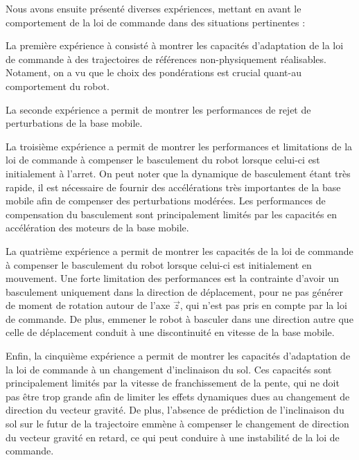       Nous avons ensuite présenté diverses expériences, mettant en avant le comportement de la loi de commande dans des situations pertinentes :
      
      La première expérience à consisté à montrer les capacités d'adaptation de la loi de commande à des trajectoires de références non-physiquement réalisables.
      Notament, on a vu que le choix des pondérations est crucial quant-au comportement du robot.
      
      La seconde expérience a permit de montrer les performances de rejet de perturbations de la base mobile.
      
      La troisième expérience a permit de montrer les performances et limitations de la loi de commande à compenser le basculement du robot lorsque celui-ci est initialement à l'arret.
      On peut noter que la dynamique de basculement étant très rapide, il est nécessaire de fournir des accélérations très importantes de la base mobile afin de compenser des perturbations modérées.
      Les performances de compensation du basculement sont principalement limités par les capacités en accélération des moteurs de la base mobile.
      
      La quatrième expérience a permit de montrer les capacités de la loi de commande à compenser le basculement du robot lorsque celui-ci est initialement en mouvement.
      Une forte limitation des performances est la contrainte d'avoir un basculement uniquement dans la direction de déplacement, pour ne pas générer de moment de rotation autour de l'axe $\vec{z}$, qui n'est pas pris en compte par la loi de commande.
      De plus, emmener le robot à basculer dans une direction autre que celle de déplacement conduit à une discontinuité en vitesse de la base mobile.
      
      Enfin, la cinquième expérience a permit de montrer les capacités d'adaptation de la loi de commande à un changement d'inclinaison du sol.
      Ces capacités sont principalement limités par la vitesse de franchissement de la pente, qui ne doit pas être trop grande afin de limiter les effets dynamiques dues au changement de direction du vecteur gravité.
      De plus, l'absence de prédiction de l'inclinaison du sol sur le futur de la trajectoire emmène à compenser le changement de direction du vecteur gravité en retard, ce qui peut conduire à une instabilité de la loi de commande.


